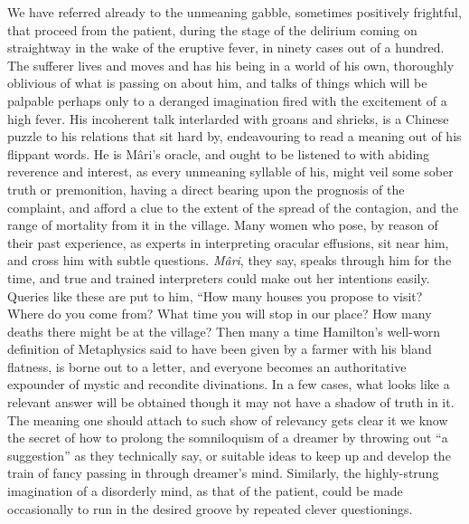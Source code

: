 \documentclass[a4paper, 12pt, oneside, english]{article}
\begin{document}
We have referred already to the unmeaning gabble, sometimes positively frightful, that proceed from the patient, during the stage of the delirium coming on straightway in the wake of the eruptive fever, in ninety cases out of a hundred. The sufferer lives and moves and has his being in a world of his own, thoroughly oblivious of what is passing on about him, and talks of things which will be palpable perhaps only to a deranged imagination fired with the excitement of a high fever. His incoherent talk interlarded with groans and shrieks, is a Chinese puzzle to his relations that sit hard by, endeavouring to read a meaning out of his flippant words. He is Mâri's oracle, and ought to be listened to with abiding reverence and interest, as every unmeaning syllable of his, might veil some sober truth or premonition, having a direct bearing upon the prognosis of the complaint, and afford a clue to the extent of the spread of the contagion, and the range of mortality from it in the village. Many women who pose, by reason of their past experience, as experts in interpreting oracular effusions, sit near him, and cross him with subtle questions. \emph{Mâri}, they say, speaks through him for the time, and true and trained interpreters could make out her intentions easily. Queries like these are put to him, ``How many houses you propose to visit? Where do you come from? What time you will stop in our place? How many deaths there might be at the village? Then many a time Hamilton's well-worn definition of Metaphysics said to have been given by a farmer with his bland flatness, is borne out to a letter, and everyone becomes an authoritative expounder of mystic and recondite divinations. In a few cases, what looks like a relevant answer will be obtained though it may not have a shadow of truth in it. The meaning one should attach to such show of relevancy gets clear it we know the secret of how to prolong the somniloquism of a dreamer by throwing out ``a suggestion'' as they technically say, or suitable ideas to keep up and develop the train of fancy passing in through dreamer's mind. Similarly, the highly-strung imagination of a disorderly mind, as that of the patient, could be made occasionally to run in the desired groove by repeated clever questionings.
\end{document}
